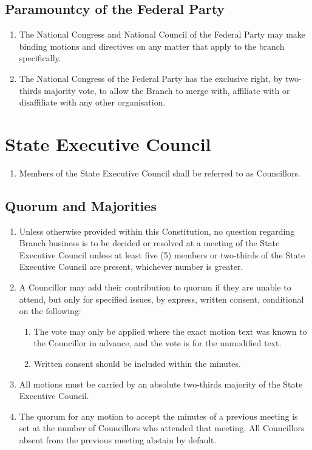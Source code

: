 \documentclass[a4paper,titlepage,8.5pt]{article}
\newcommand{\stateorterritory}{State}
\begin{document}
\subsection{Paramountcy of the Federal Party}

\begin{enumerate}

\item The National Congress and National Council of the Federal Party may make binding motions and directives on any matter that apply to the branch specifically.
\item The National Congress of the Federal Party has the exclusive right, by two-thirds majority vote, to allow the Branch to merge with, affiliate with or disaffiliate with any other organisation.

\end{enumerate}

\section{{\stateorterritory} Executive Council}

\begin{enumerate}
\item Members of the {\stateorterritory} Executive Council shall be referred to as Councillors.
\end{enumerate}

\subsection{Quorum and Majorities}

\begin{enumerate}
\item Unless otherwise provided within this Constitution, no question regarding Branch business is to be decided or resolved at a meeting of the {\stateorterritory} Executive Council unless at least five (5) members or two-thirds of the {\stateorterritory} Executive Council are present, whichever number is greater.
\item A Councillor may add their contribution to quorum if they are unable to attend, but only for specified issues, by express, written consent, conditional on the following:
\begin{enumerate}
\item The vote may only be applied where the exact motion text was known to the Councillor in advance, and the vote is for the unmodified text.
\item Written consent should be included within the minutes.
\end{enumerate}
\item All motions must be carried by an absolute two-thirds majority of the {\stateorterritory} Executive Council.
\item The quorum for any motion to accept the minutes of a previous meeting is set at the number of Councillors who attended that meeting. All Councillors absent from the previous meeting abstain by default.
\end{enumerate}
\end{document}
